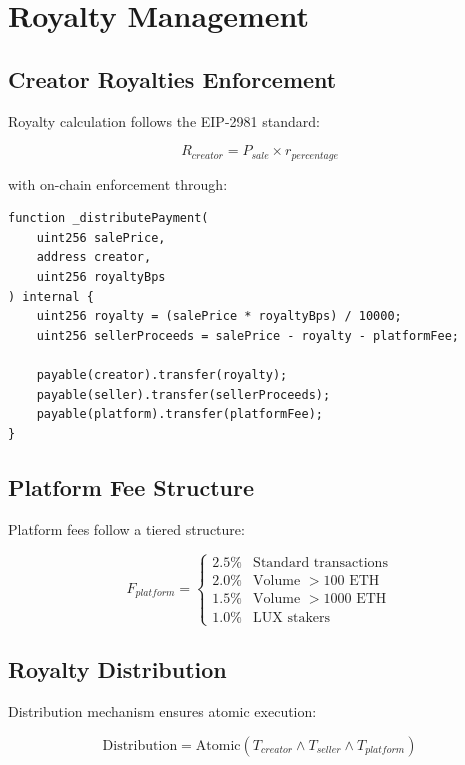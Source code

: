 \section{Royalty Management}


\subsection{Creator Royalties Enforcement}

Royalty calculation follows the EIP-2981 standard:

\begin{equation}
R_{creator} = P_{sale} \times r_{percentage}
\end{equation}

with on-chain enforcement through:

\begin{lstlisting}[language=Solidity]
function _distributePayment(
    uint256 salePrice,
    address creator,
    uint256 royaltyBps
) internal {
    uint256 royalty = (salePrice * royaltyBps) / 10000;
    uint256 sellerProceeds = salePrice - royalty - platformFee;
    
    payable(creator).transfer(royalty);
    payable(seller).transfer(sellerProceeds);
    payable(platform).transfer(platformFee);
}
\end{lstlisting}

\subsection{Platform Fee Structure}

Platform fees follow a tiered structure:

\begin{equation}
F_{platform} = \begin{cases}
2.5\% & \text{Standard transactions} \\
2.0\% & \text{Volume } > 100 \text{ ETH} \\
1.5\% & \text{Volume } > 1000 \text{ ETH} \\
1.0\% & \text{LUX stakers}
\end{cases}
\end{equation}

\subsection{Royalty Distribution}

Distribution mechanism ensures atomic execution:

\begin{equation}
\text{Distribution} = \text{Atomic}\left( T_{creator} \land T_{seller} \land T_{platform} \right)
\end{equation}

